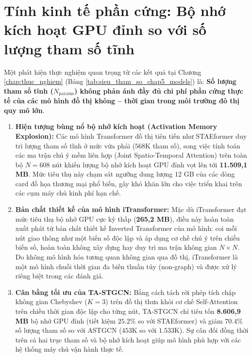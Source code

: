 \section{Tính kinh tế phần cứng: Bộ nhớ kích hoạt GPU đỉnh so với số lượng tham số tĩnh}
\label{sec:tinh_kinh_te_phan_cung}

Một phát hiện thực nghiệm quan trọng từ các kết quả tại Chương \ref{chap:thuc_nghiem} (Bảng \ref{tab:sieu_tham_so_chap5_models}) là: \textbf{Số lượng tham số tĩnh ($N_{\text{params}}$) không phản ánh đầy đủ chi phí phần cứng thực tế của các mô hình đồ thị không -- thời gian trong môi trường đô thị quy mô lớn}.

\begin{enumerate}
    \item \textbf{Hiện tượng bùng nổ bộ nhớ kích hoạt (Activation Memory Explosion):} Các mô hình Transformer đồ thị tiên tiến như STAEformer duy trì lượng tham số tĩnh ở mức vừa phải ($568\text{K}$ tham số), song việc tính toán các ma trận chú ý mềm liên hợp (Joint Spatio-Temporal Attention) trên toàn bộ $N=608$ nút khiến lượng bộ nhớ kích hoạt GPU đỉnh vọt lên tới \textbf{11.509,1 MB}. Mức tiêu thụ này chạm sát ngưỡng dung lượng 12 GB của các dòng card đồ họa thương mại phổ biến, gây khó khăn lớn cho việc triển khai trên các cụm máy chủ kinh phí hạn chế.
    \item \textbf{Bản chất thiết kế của mô hình iTransformer:} Mặc dù iTransformer đạt mức tiêu thụ bộ nhớ GPU cực kỳ thấp (\textbf{265,2 MB}), điều này hoàn toàn xuất phát từ bản chất thiết kế Inverted Transformer của mô hình: coi mỗi nút giao thông như một biến số độc lập và áp dụng cơ chế chú ý trên chiều biến số, hoàn toàn không xây dựng hay duy trì ma trận không gian $N \times N$. Do không mô hình hóa tương quan không gian qua đồ thị, iTransformer là một mô hình chuỗi thời gian đa biến thuần túy (non-graph) và được xử lý riêng biệt trong các đánh giá.
    \item \textbf{Cân bằng tối ưu của TA-STGCN:} Bằng cách tách rời phép tích chập không gian Chebyshev ($K=3$) trên đồ thị thưa khỏi cơ chế Self-Attention trên chiều thời gian độc lập cho từng nút, TA-STGCN chỉ tiêu tốn \textbf{8.606,9 MB} bộ nhớ GPU đỉnh (tiết kiệm $25.2\%$ so với STAEformer) và giảm $70.4\%$ số lượng tham số so với ASTGCN ($453\text{K}$ so với $1.533\text{K}$). Sự cân đối đồng thời trên cả hai trục tham số và bộ nhớ kích hoạt giúp mô hình phù hợp với các hệ thống máy chủ vận hành thực tế.
\end{enumerate}

